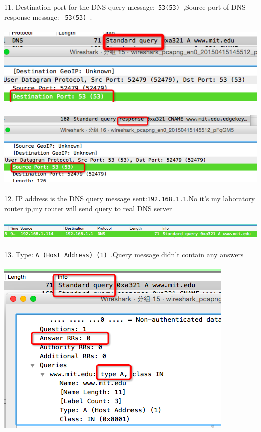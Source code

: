 \documentclass[a4paper]{article}
\begin{document}
{	11. Destination port for the DNS query message:\verb| 53(53) |,Source port of DNS response message: \verb| 53(53) |.\\\\
	{\centering\includegraphics[scale=0.5]{Illustrations/11_1.png}}\\\\
	{\centering\includegraphics[scale=0.5]{Illustrations/11_2.png}}\\\\
	12. IP address is the DNS query message sent:\verb|192.168.1.1|.No it's my laboratory router ip,my router will send query to real DNS server\\\\
	{\centering\includegraphics[scale=0.5]{Illustrations/12.png}}\\\\
	13. Type: \verb|A (Host Address) (1) |.Query message didn't contain any answers\\\\
	{\centering\includegraphics[scale=0.5]{Illustrations/13.png}}\\\\
}
\end{document}
